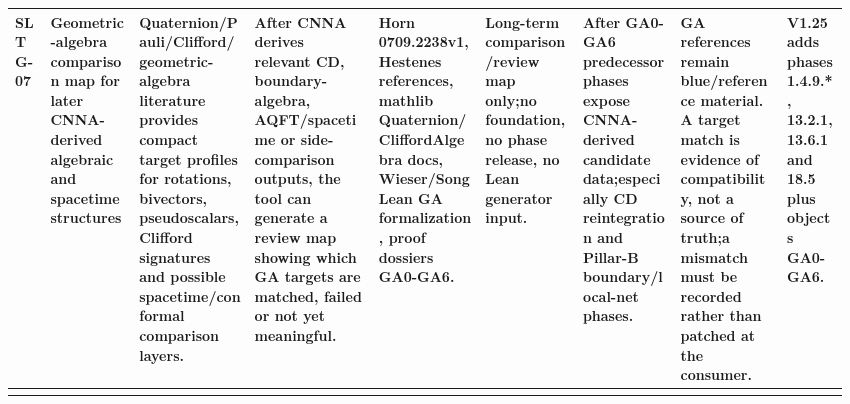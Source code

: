 \begin{longtable}{L{0.04\linewidth} L{0.105\linewidth} L{0.135\linewidth} L{0.145\linewidth} L{0.12\linewidth} L{0.115\linewidth} L{0.115\linewidth} L{0.12\linewidth} L{0.075\linewidth}}
\hline
\addlinespace[0.24em]
SLTG-07 & Geometric-algebra comparison map for later CNNA-derived algebraic and spacetime structures & Quaternion/\allowbreak{}Pauli/\allowbreak{}Clifford/\allowbreak{}geometric-algebra literature provides compact target profiles for rotations, bivectors, pseudoscalars, Clifford signatures and possible spacetime/\allowbreak{}conformal comparison layers. & After CNNA derives relevant CD, boundary-algebra, AQFT/\allowbreak{}spacetime or side-comparison outputs, the tool can generate a review map showing which GA targets are matched, failed or not yet meaningful. & Horn 0709.2238v1, Hestenes references, mathlib Quaternion/\allowbreak{}CliffordAlgebra docs, Wieser/\allowbreak{}Song Lean GA formalization, proof dossiers GA0-GA6. & Long-term comparison/\allowbreak{}review map only;\newline no foundation, no phase release, no Lean generator input. & After GA0-GA6 predecessor phases expose CNNA-derived candidate data;\newline especially CD reintegration and Pillar-B boundary/\allowbreak{}local-net phases. & GA references remain blue/\allowbreak{}reference material. A target match is evidence of compatibility, not a source of truth;\newline a mismatch must be recorded rather than patched at the consumer. & V1.25 adds phases 1.4.9.*, 13.2.1, 13.6.1 and 18.5 plus objects GA0-GA6.\\
\hline
\addlinespace[0.24em]
\end{longtable}
\normalsize
